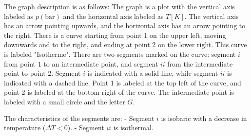 The graph description is as follows: The graph is a plot with the vertical axis labeled as \( p(\text{bar}) \) and the horizontal axis labeled as \( T [K] \). The vertical axis has an arrow pointing upwards, and the horizontal axis has an arrow pointing to the right. There is a curve starting from point 1 on the upper left, moving downwards and to the right, and ending at point 2 on the lower right. This curve is labeled "Isotherme". There are two segments marked on the curve: segment \( i \) from point 1 to an intermediate point, and segment \( ii \) from the intermediate point to point 2. Segment \( i \) is indicated with a solid line, while segment \( ii \) is indicated with a dashed line. Point 1 is labeled at the top left of the curve, and point 2 is labeled at the bottom right of the curve. The intermediate point is labeled with a small circle and the letter \( G \).

The characteristics of the segments are:
- Segment \( i \) is isobaric with a decrease in temperature (\(\Delta T < 0\)).
- Segment \( ii \) is isothermal.